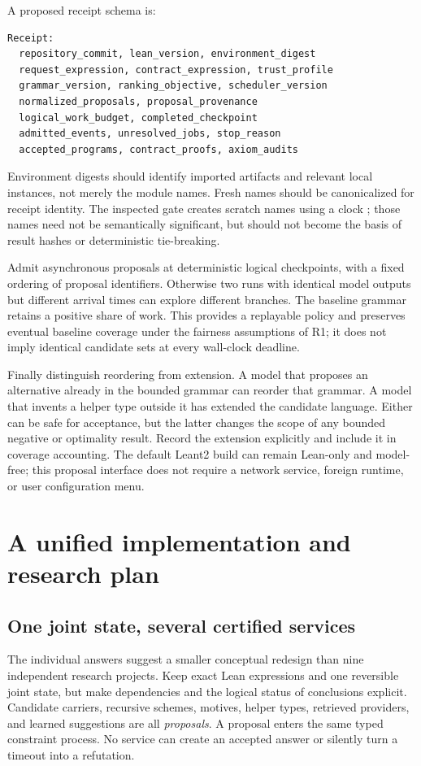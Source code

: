 \documentclass[11pt,a4paper]{article}
\theoremstyle{definition}
\theoremstyle{remark}
\begin{document}
A proposed receipt schema is:
\par\noindent\begin{minipage}{\linewidth}
\begin{lstlisting}
Receipt:
  repository_commit, lean_version, environment_digest
  request_expression, contract_expression, trust_profile
  grammar_version, ranking_objective, scheduler_version
  normalized_proposals, proposal_provenance
  logical_work_budget, completed_checkpoint
  admitted_events, unresolved_jobs, stop_reason
  accepted_programs, contract_proofs, axiom_audits
\end{lstlisting}
\end{minipage}\par
Environment digests should identify imported artifacts and relevant local
instances, not merely the module names. Fresh names should be canonicalized
for receipt identity. The inspected gate creates scratch names using a clock
\cite{srcgate}; those names need not be semantically significant, but should
not become the basis of result hashes or deterministic tie-breaking.

Admit asynchronous proposals at deterministic logical checkpoints, with a
fixed ordering of proposal identifiers. Otherwise two runs with identical
model outputs but different arrival times can explore different branches.
The baseline grammar retains a positive share of work. This provides a
replayable policy and preserves eventual baseline coverage under the fairness
assumptions of R1; it does not imply identical candidate sets at every wall-clock
deadline.

Finally distinguish reordering from extension. A model that proposes an
alternative already in the bounded grammar can reorder that grammar. A model
that invents a helper type outside it has extended the candidate language.
Either can be safe for acceptance, but the latter changes the scope of any
bounded negative or optimality result. Record the extension explicitly and
include it in coverage accounting. The default Leant2 build can remain
Lean-only and model-free; this proposal interface does not require a network
service, foreign runtime, or user configuration menu.

\section{A unified implementation and research plan}
\label{sec:plan}

\subsection{One joint state, several certified services}
The individual answers suggest a smaller conceptual redesign than nine
independent research projects. Keep exact Lean expressions and one reversible
joint state, but make dependencies and the logical status of conclusions
explicit. Candidate carriers, recursive schemes, motives, helper types,
retrieved providers, and learned suggestions are all \emph{proposals}. A proposal
enters the same typed constraint process. No service can create an accepted
answer or silently turn a timeout into a refutation.
\end{document}
